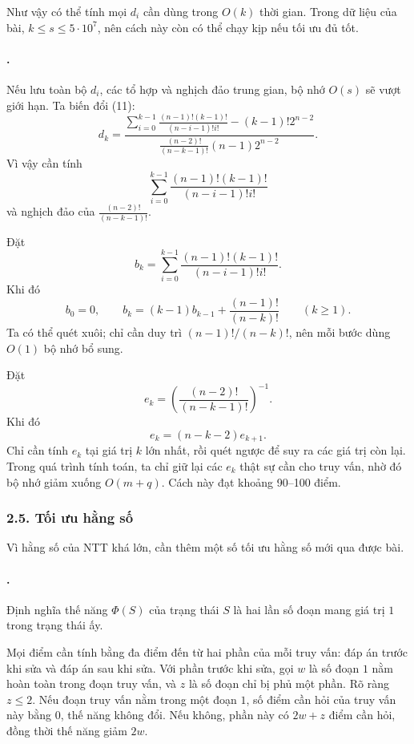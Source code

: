 \documentclass[11pt]{article}
\begin{document}
Như vậy có thể tính mọi \(d_i\) cần dùng trong \(O(k)\) thời gian. Trong dữ
liệu của bài, \(k\le s\le 5\cdot10^7\), nên cách này còn có thể chạy kịp nếu
tối ưu đủ tốt.

\paragraph{.}
Nếu lưu toàn bộ \(d_i\), các tổ hợp và nghịch đảo trung gian, bộ nhớ
\(O(s)\) sẽ vượt giới hạn. Ta biến đổi (11):
\[
  d_k=
  \frac{
    \sum_{i=0}^{k-1}\frac{(n-1)!(k-1)!}{(n-i-1)!i!}
    -(k-1)!2^{n-2}}
  {\frac{(n-2)!}{(n-k-1)!}(n-1)2^{n-2}}.
\]
Vì vậy cần tính
\[
  \sum_{i=0}^{k-1}\frac{(n-1)!(k-1)!}{(n-i-1)!i!}
\]
và nghịch đảo của \(\frac{(n-2)!}{(n-k-1)!}\).

Đặt
\[
  b_k=\sum_{i=0}^{k-1}\frac{(n-1)!(k-1)!}{(n-i-1)!i!}.
\]
Khi đó
\[
  b_0=0,\qquad
  b_k=(k-1)b_{k-1}+\frac{(n-1)!}{(n-k)!}\qquad (k\ge 1).
\]
Ta có thể quét xuôi; chỉ cần duy trì
\((n-1)!/(n-k)!\), nên mỗi bước dùng \(O(1)\) bộ nhớ bổ sung.

Đặt
\[
  e_k=\left(\frac{(n-2)!}{(n-k-1)!}\right)^{-1}.
\]
Khi đó
\[
  e_k=(n-k-2)e_{k+1}.
\]
Chỉ cần tính \(e_k\) tại giá trị \(k\) lớn nhất, rồi quét ngược để suy ra các
giá trị còn lại. Trong quá trình tính toán, ta chỉ giữ lại các \(e_k\) thật sự
cần cho truy vấn, nhờ đó bộ nhớ giảm xuống \(O(m+q)\). Cách này đạt khoảng
90--100 điểm.

\subsubsection*{2.5. Tối ưu hằng số}

Vì hằng số của NTT khá lớn, cần thêm một số tối ưu hằng số mới qua được bài.

\paragraph{.}
Định nghĩa thế năng \(\Phi(S)\) của trạng thái \(S\) là hai lần số đoạn mang
giá trị \(1\) trong trạng thái ấy.

Mọi điểm cần tính bằng đa điểm đến từ hai phần của mỗi truy vấn: đáp án trước
khi sửa và đáp án sau khi sửa. Với phần trước khi sửa, gọi \(w\) là số đoạn
\(1\) nằm hoàn toàn trong đoạn truy vấn, và \(z\) là số đoạn chỉ bị phủ một
phần. Rõ ràng \(z\le 2\). Nếu đoạn truy vấn nằm trong một đoạn \(1\), số điểm
cần hỏi của truy vấn này bằng \(0\), thế năng không đổi. Nếu không, phần này
có \(2w+z\) điểm cần hỏi, đồng thời thế năng giảm \(2w\).
\end{document}
